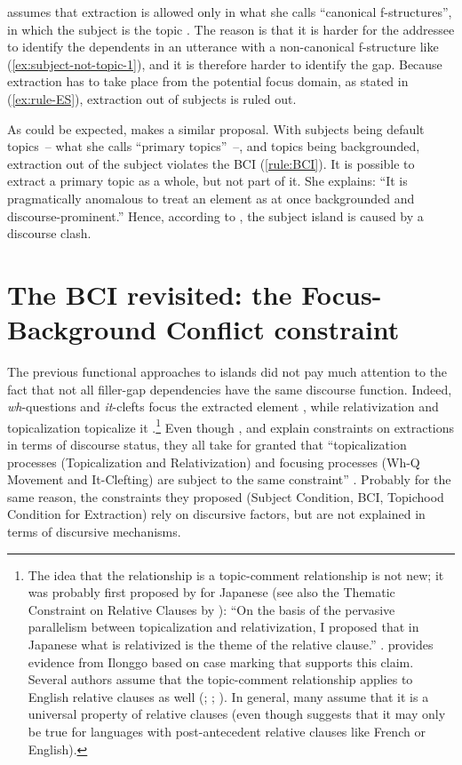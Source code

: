 \citet[324]{Erteschik-Shir.2006} assumes that extraction is allowed only in what she calls ``canonical f-structures'', in which the subject is the topic \citep[see also][186]{Erteschik-Shir.1997}. The reason is that it is harder for the addressee to identify the dependents in an utterance with a non-canonical f-structure like (\ref{ex:subject-not-topic-1}), and it is therefore harder to identify the gap. Because extraction has to take place from the potential focus domain, as stated in (\ref{ex:rule-ES}), extraction out of subjects is ruled out.

As could be expected, \citet{Goldberg.2006} makes a similar proposal. With subjects being default topics~-- what she calls ``primary topics''~--, and topics being backgrounded, extraction out of the subject violates the BCI (\ref{rule:BCI}).
It is possible to extract a primary topic as a whole, but not part of it. She explains: ``It is pragmatically
anomalous to treat an element as at once backgrounded and discourse-prominent.'' Hence, according to \citeauthor{Goldberg.2006}, the subject island is caused by a discourse clash.

\section{The BCI revisited: the Focus-Background Conflict constraint}

The previous functional approaches to islands did not pay much attention to the fact that not all filler-gap dependencies have the same discourse function. Indeed, \emph{wh}-questions and \emph{it}-clefts focus the extracted element \citep{Lambrecht.1994}, while relativization and topicalization topicalize it \citep[15]{Kuno.1987}.\footnote{The idea that the relationship is a topic-comment relationship is not new; it was probably first proposed by \citet{Kuno.1973} for Japanese (see also the Thematic Constraint on Relative Clauses by \citealt[420]{Kuno.1976}): ``On the basis of the pervasive parallelism between topicalization and relativization, I proposed that in Japanese what is relativized is the theme of the relative clause.'' \citep[15]{Kuno.1987}. \citet[25]{Schachter.1973} provides evidence from Ilonggo based on case marking that supports this claim. Several authors assume that the topic-comment relationship applies to English relative clauses as well (\citealt{Gundel.1974}; \citealt[79]{Gundel.1988}; \citealt[15]{Kuno.1987}). In general, many assume that it is a universal property of relative clauses (even though \citet{Lambrecht.1994} suggests that it may only be true for languages with post-antecedent relative clauses like French or English).}
Even though \citeauthor{Erteschik-Shir.1973}, \citeauthor{Kuno.1972} and \citeauthor{Goldberg.2006} explain constraints on extractions in terms of discourse status, they all take for granted that
``topicalization processes (Topicalization and Relativization) and focusing processes (Wh-Q Movement and It-Clefting) are subject to the same constraint'' \citep[27]{Kuno.1987}.
Probably for the same reason, the constraints they proposed (Subject Condition, BCI, Topichood Condition for Extraction) rely on discursive factors, but are not explained in terms of discursive mechanisms. 


